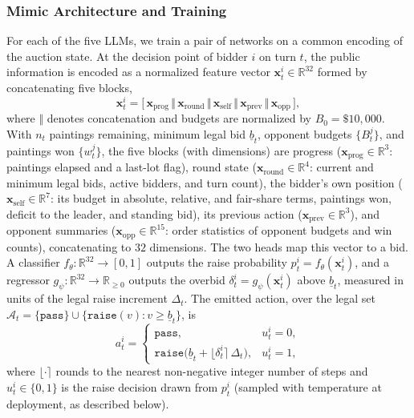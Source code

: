 \documentclass[conference]{IEEEtran}
\begin{document}
\subsubsection{Mimic Architecture and Training}
For each of the five LLMs, we train a pair of networks on a common encoding of the auction state. At the decision point of bidder $i$ on turn $t$, the public information is encoded as a normalized feature vector $\mathbf{x}^i_t \in \mathbb{R}^{32}$ formed by concatenating five blocks,
\begin{equation}
\mathbf{x}^i_t = \big[\, \mathbf{x}_{\mathrm{prog}} \,\Vert\, \mathbf{x}_{\mathrm{round}} \,\Vert\, \mathbf{x}_{\mathrm{self}} \,\Vert\, \mathbf{x}_{\mathrm{prev}} \,\Vert\, \mathbf{x}_{\mathrm{opp}} \,\big],
\end{equation}
where $\Vert$ denotes concatenation and budgets are normalized by $B_0 = \$10{,}000$. With $n_t$ paintings remaining, minimum legal bid $\underline{b}_t$, opponent budgets $\{B^j_t\}$, and paintings won $\{w^j_t\}$, the five blocks (with dimensions) are progress ($\mathbf{x}_{\mathrm{prog}}\in\mathbb{R}^{3}$: paintings elapsed and a last-lot flag), round state ($\mathbf{x}_{\mathrm{round}}\in\mathbb{R}^{4}$: current and minimum legal bids, active bidders, and turn count), the bidder's own position ($\mathbf{x}_{\mathrm{self}}\in\mathbb{R}^{7}$: its budget in absolute, relative, and fair-share terms, paintings won, deficit to the leader, and standing bid), its previous action ($\mathbf{x}_{\mathrm{prev}}\in\mathbb{R}^{3}$), and opponent summaries ($\mathbf{x}_{\mathrm{opp}}\in\mathbb{R}^{15}$: order statistics of opponent budgets and win counts), concatenating to $32$ dimensions.
The two heads map this vector to a bid. A classifier $f_\theta : \mathbb{R}^{32} \to [0,1]$ outputs the raise probability $p^i_t = f_\theta(\mathbf{x}^i_t)$, and a regressor $g_\psi : \mathbb{R}^{32} \to \mathbb{R}_{\ge 0}$ outputs the overbid $\delta^i_t = g_\psi(\mathbf{x}^i_t)$ above $\underline{b}_t$, measured in units of the legal raise increment $\Delta_t$. The emitted action, over the legal set $\mathcal{A}_t = \{\texttt{pass}\} \cup \{\texttt{raise}(v) : v \ge \underline{b}_t\}$, is
\begin{equation}
a^i_t =
\begin{cases}
\texttt{pass}, & u^i_t = 0,\\[2pt]
\texttt{raise}\big(\underline{b}_t + \lfloor \delta^i_t \rceil\, \Delta_t\big), & u^i_t = 1,
\end{cases}
\end{equation}
where $\lfloor\cdot\rceil$ rounds to the nearest non-negative integer number of steps and $u^i_t \in \{0,1\}$ is the raise decision drawn from $p^i_t$ (sampled with temperature at deployment, as described below).
\end{document}
